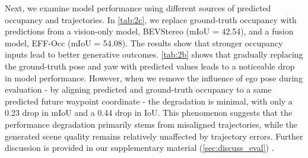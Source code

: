 Next, we examine model performance using different sources of predicted occupancy and trajectories. 
In \cref{tab:2c}, we replace ground-truth occupancy with predictions from a vision-only model, BEVStereo (mIoU = 42.54), and a fusion model, EFF-Occ (mIoU = 54.08). 
The results show that stronger occupancy inputs lead to better generative outcomes.
\cref{tab:2b} shows that gradually replacing the ground-truth pose and yaw with predicted values leads to a noticeable drop in model performance. 
However, when we remove the influence of ego pose during evaluation - by aligning predicted and ground-truth occupancy to a same predicted future waypoint coordinate - the degradation is minimal, with only a 0.23 drop in mIoU and a 0.44 drop in IoU.
This phenomenon suggests that the performance degradation primarily stems from misaligned trajectories, while the generated scene quality remains relatively unaffected by trajectory errors. 
Further discussion is provided in our supplementary material (\cref{sec:discuss_eval}) .

